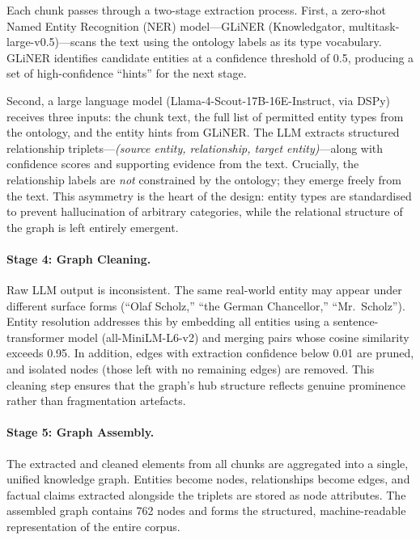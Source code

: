 \documentclass[11pt]{article}
\begin{document}
Each chunk passes through a two-stage extraction process. First, a zero-shot Named Entity Recognition (NER) model---GLiNER (Knowledgator, multitask-large-v0.5)---scans the text using the ontology labels as its type vocabulary. GLiNER identifies candidate entities at a confidence threshold of 0.5, producing a set of high-confidence ``hints'' for the next stage.

Second, a large language model (Llama-4-Scout-17B-16E-Instruct, via DSPy) receives three inputs: the chunk text, the full list of permitted entity types from the ontology, and the entity hints from GLiNER. The LLM extracts structured relationship triplets---\emph{(source entity, relationship, target entity)}---along with confidence scores and supporting evidence from the text. Crucially, the relationship labels are \emph{not} constrained by the ontology; they emerge freely from the text. This asymmetry is the heart of the design: entity types are standardised to prevent hallucination of arbitrary categories, while the relational structure of the graph is left entirely emergent.


\paragraph{Stage 4: Graph Cleaning.}

Raw LLM output is inconsistent. The same real-world entity may appear under different surface forms (``Olaf Scholz,'' ``the German Chancellor,'' ``Mr.\ Scholz''). Entity resolution addresses this by embedding all entities using a sentence-transformer model (all-MiniLM-L6-v2) and merging pairs whose cosine similarity exceeds 0.95. In addition, edges with extraction confidence below 0.01 are pruned, and isolated nodes (those left with no remaining edges) are removed. This cleaning step ensures that the graph's hub structure reflects genuine prominence rather than fragmentation artefacts.


\paragraph{Stage 5: Graph Assembly.}

The extracted and cleaned elements from all chunks are aggregated into a single, unified knowledge graph. Entities become nodes, relationships become edges, and factual claims extracted alongside the triplets are stored as node attributes. The assembled graph contains 762 nodes and forms the structured, machine-readable representation of the entire corpus.
\end{document}
